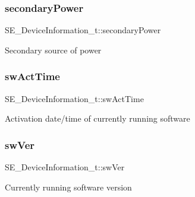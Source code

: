 \subsubsection{\texorpdfstring{secondary\+Power}{secondaryPower}}
{\footnotesize\ttfamily S\+E\+\_\+\+Device\+Information\+\_\+t\+::secondary\+Power}

Secondary source of power \mbox{\label{group__DeviceInformation_gaf5c095448352c4991118c909f8eee40e}} 
\subsubsection{\texorpdfstring{sw\+Act\+Time}{swActTime}}
{\footnotesize\ttfamily S\+E\+\_\+\+Device\+Information\+\_\+t\+::sw\+Act\+Time}

Activation date/time of currently running software \mbox{\label{group__DeviceInformation_ga1291b6f479ed99ca846ffd34beb6c3c0}} 
\subsubsection{\texorpdfstring{sw\+Ver}{swVer}}
{\footnotesize\ttfamily S\+E\+\_\+\+Device\+Information\+\_\+t\+::sw\+Ver}

Currently running software version 